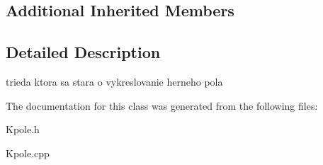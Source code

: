 \subsection*{Additional Inherited Members}


\subsection{Detailed Description}
trieda ktora sa stara o vykreslovanie herneho pola 

The documentation for this class was generated from the following files\-:\begin{DoxyCompactItemize}
\item 
Kpole.\-h\item 
Kpole.\-cpp\end{DoxyCompactItemize}
